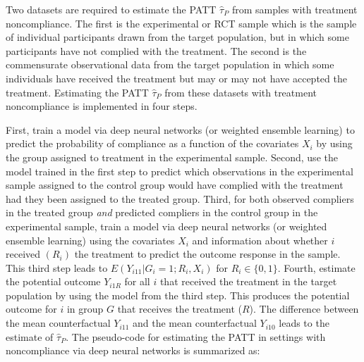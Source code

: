 Two datasets are required to estimate the PATT \(\widehat{\tau}_{P}\) from
samples with treatment noncompliance. The first is the experimental or
RCT sample which is the sample of individual participants drawn from the
target population, but in which some participants have not complied with
the treatment. The second is the commensurate observational data from
the target population in which some individuals have received the
treatment but may or may not have accepted the treatment. Estimating the
PATT \(\widehat{\tau}_{P}\) from these datasets with treatment
noncompliance is implemented in four steps.

First, train a model via deep neural networks (or weighted ensemble
learning) to predict the probability of compliance as a function of the
covariates \(X_{i}\) by using the group assigned to treatment in the
experimental sample. Second, use the model trained in the first step to
predict which observations in the experimental sample assigned to the
control group would have complied with the treatment had they been
assigned to the treated group. Third, for both observed compliers in the
treated group \emph{and} predicted compliers in the control group in the
experimental sample, train a model via deep neural networks (or weighted
ensemble learning) using the covariates \(X_{i}\) and information about
whether \(i\) received \((R_{i})\) the treatment to predict the outcome
response in the sample. This third step leads to
\(E\left(Y_{i11}|G_{i}=1;R_{i},X_{i}\right)\) for \(R_{i}\in\{0,1\}\).
Fourth, estimate the potential outcome \(Y_{i1R}\) for all \(i\) that
received the treatment in the target population by using the model from
the third step. This produces the potential outcome for \(i\) in group \(G\)
that receives the treatment (\(R\)). The difference between the mean
counterfactual \(Y_{i11}\) and the mean counterfactual \(Y_{i10}\) leads to
the estimate of \(\widehat{\tau}_{P}\). The pseudo-code for estimating the
PATT in settings with noncompliance via deep neural networks is
summarized as:

\begin{table}[!h]
    \centering
    \label{tab:pseudopatt}
\end{table}

